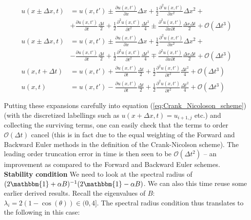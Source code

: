 \documentclass[a4paper, 11pt, notitlepage,english]{article}
\newcommand{\id}{\mathbbm{1}}
\begin{document}
\begin{align}
u(x\pm\Delta x,t) &= u(x,t') \pm \frac{\partial u(x,t')}{\partial x}\Delta x + \frac{1}{2}\frac{\partial^2 u(x,t')}{\partial x^2}\Delta x^2 + \\
&+ \frac{\partial u(x,t')}{\partial t}\frac{\Delta t}{2} + \frac{1}{2}\frac{\partial^2 u(x,t')}{\partial t^2}\frac{\Delta t^2}{4} \pm \frac{\partial^2 u(x,t')}{\partial x \partial t}\frac{\Delta x \Delta t}{2} + \mathcal{O}(\Delta t^3)
\label{eq:Crank_Nicolson_expansions1} \\
u(x\pm\Delta x,t) &= u(x,t') \pm \frac{\partial u(x,t')}{\partial x}\Delta x + \frac{1}{2}\frac{\partial^2 u(x,t')}{\partial x^2}\Delta x^2 + \\
&- \frac{\partial u(x,t')}{\partial t}\frac{\Delta t}{2} + \frac{1}{2}\frac{\partial^2 u(x,t')}{\partial t^2}\frac{\Delta t^2}{4} \mp \frac{\partial^2 u(x,t')}{\partial x \partial t}\frac{\Delta x \Delta t}{2} + \mathcal{O}(\Delta t^3)
\label{eq:Crank_Nicolson_expansion2} \\
u(x,t+\Delta t) &= u(x,t') + \frac{\partial u(x,t')}{\partial t}\frac{\Delta t}{2} + \frac{1}{2}\frac{\partial^2 u(x,t')}{\partial t^2}\frac{\Delta t^2}{4}  + \mathcal{O}(\Delta t^3)
\label{eq:Crank_Nicolson_expansion3} \\
u(x,t) &= u(x,t') - \frac{\partial u(x,t')}{\partial t}\frac{\Delta t}{2} + \frac{1}{2}\frac{\partial^2 u(x,t')}{\partial t^2}\frac{\Delta t^2}{4}  + \mathcal{O}(\Delta t^3)
\label{eq:Crank_Nicolson_expansion4}
\end{align}

Putting these expansions carefully into equation (\ref{eq:Crank_Nicoloson_scheme}) (with the discretized labellings such as $u(x+\Delta x,t) = u_{i+1,j}$ etc.) and collecting the surviving terms, one can easily check that the terms to order $\mathcal{O}(\Delta t)$ cancel (this is in fact due to the equal weighting of the Forward and Backward Euler methods in the definition of the Crank-Nicolson scheme). The leading order truncation error in time is then seen to be $\mathcal{O}(\Delta t^2)$ – an improvement as compared to the Forward and Backward Euler schemes. \\

\textbf{Stability condition} \newline
We need to look at the spectral radius of $(2\id + \alpha B)^{-1}(2\id -\alpha B)$. We can also this time reuse some earlier derived results. Recall the eigenvalues of $B$: $\lambda_i = 2(1-\cos(\theta) ) \in (0,4]$. The spectral radius condition thus translates to the following in this case:
\end{document}
